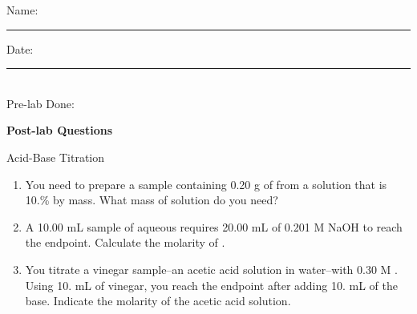 \documentclass[main.tex]{subfiles}
\begin{document}
\newpage
\begin{multicols}{2}
\begin{tcolorbox}[enhanced jigsaw,breakable,size=title,
colback=mybrown!05,colframe=black,fonttitle=\bfseries,
title=STUDENT INFO,pad at break=1mm, break at=15cm/0pt ]
\vspace{0.2cm}
\noindent Name: \rule{5cm}{0.4pt}Date:\rule{1cm}{0.4pt}\\
Pre-lab Done: \quad
\end{tcolorbox}
\end{multicols}
\hfill
\vspace{0.2cm}
\begin{center}
{\large \bfseries 
Post-lab Questions 
\par
\Huge
Acid-Base Titration
\\[5pt] \par}
\vspace{0.2cm}
\end{center}
\par
\noindent
\uline{  \hfill \normalsize \hfill       }


\begin{enumerate}
\item You need to prepare a sample containing 0.20 g of  from a solution that is 10.\%  by mass. What mass of solution do you need?\vspace{3cm}

\item A 10.00 mL sample of aqueous  requires 20.00 mL of 0.201 M NaOH to reach the endpoint. Calculate the molarity of . \vspace{3cm}

\item You titrate a vinegar sample--an acetic acid solution in water--with 0.30 M . Using 10. mL of vinegar, you reach the endpoint after adding 10. mL of the base. Indicate the molarity of the acetic acid solution.
\end{enumerate}



 
\end{document}

